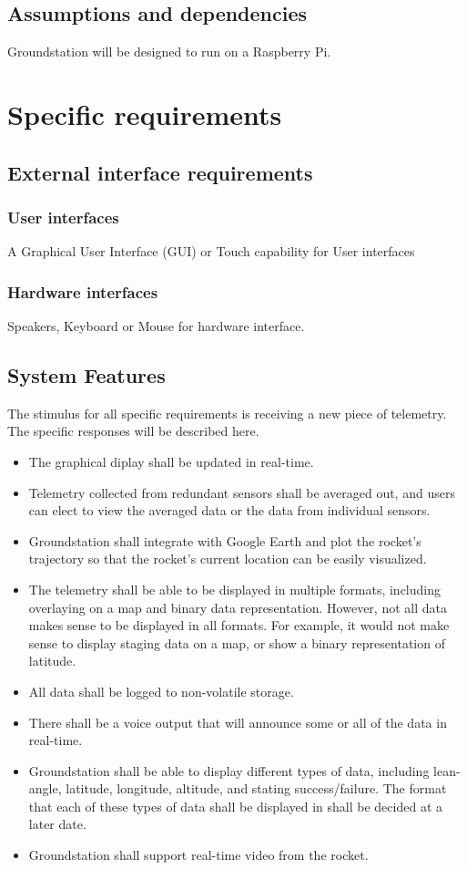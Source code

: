 \documentclass[10pt,journal,draftclsnofoot,onecolumn]{IEEEtran}
\begin{document}
	\subsection{Assumptions and dependencies}
	Groundstation will be designed to run on a Raspberry Pi.
	
	\section{Specific requirements}
	
	\subsection{External interface requirements}
	\subsubsection{User interfaces}
	A Graphical User Interface (GUI) or Touch capability for User interfaces
	\subsubsection{Hardware interfaces}
	Speakers, Keyboard or Mouse for hardware interface.
	
	\subsection{System Features}
	
	The stimulus for all specific requirements is receiving a new piece of telemetry. The specific responses will be described here.
		
	\begin{itemize}
		\item The graphical diplay shall be updated in real-time.
		\item Telemetry collected from redundant sensors shall be averaged out, and users can elect to view the averaged data or the data from individual sensors.
		\item Groundstation shall integrate with Google Earth and plot the rocket's trajectory so that the rocket's current location can be easily visualized.
		\item The telemetry shall be able to be displayed in multiple formats, including overlaying on a map and binary data representation.
		However, not all data makes sense to be displayed in all formats.
		For example, it would not make sense to display staging data on a map, or show a binary representation of latitude.
		\item All data shall be logged to non-volatile storage.
		\item There shall be a voice output that will announce some or all of the data in real-time.
		\item Groundstation shall be able to display different types of data, including lean-angle, latitude, longitude, altitude, and stating success/failure. The format that each of these types of data shall be displayed in shall be decided at a later date.
		\item Groundstation shall support real-time video from the rocket.
	\end{itemize}
	
\end{document}
